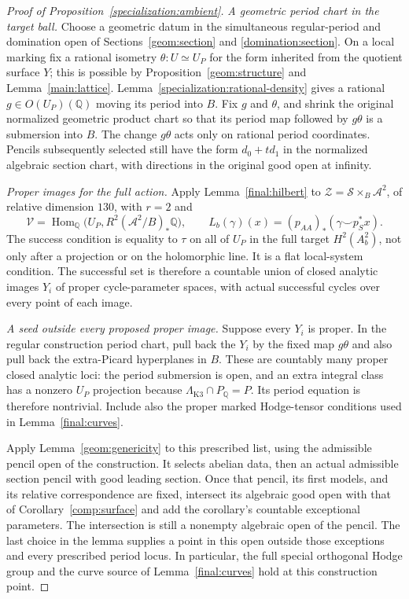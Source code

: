 \documentclass[11pt]{amsart}
\newcommand{\Q}{\mathbb Q}
\DeclareMathOperator{\Hom}{Hom}
\theoremstyle{definition}
\theoremstyle{remark}
\numberwithin{equation}{section}
\begin{document}
\begin{proof}[Proof of Proposition~\ref{specialization:ambient}]
\emph{A geometric period chart in the target ball.}
Choose a geometric datum in the simultaneous regular-period and
domination open of Sections~\ref{geom:section} and
\ref{domination:section}.  On a local marking fix a rational isometry
$\theta:U\simeq U_P$ for the form inherited from the quotient surface
$Y$; this is possible by Proposition~\ref{geom:structure} and
Lemma~\ref{main:lattice}.  Lemma~\ref{specialization:rational-density}
gives a rational $g\in O(U_P)(\Q)$ moving its period into $B$.
Fix $g$ and $\theta$, and shrink the original normalized geometric
product chart so that its period map followed by $g\theta$ is a
submersion into $B$.
The change $g\theta$ acts only on rational period coordinates.
Pencils subsequently selected still have the form $d_0+td_1$ in the
normalized algebraic section chart, with directions in the original
good open at infinity.

\emph{Proper images for the full action.}
Apply Lemma~\ref{final:hilbert} to
$\mathcal Z=\mathcal S\times_B\mathcal A^2$, of relative dimension
$130$, with $r=2$ and
\[
 \mathcal V=\Hom_{\Q}\bigl(U_P,R^2(\mathcal A^2/B)_*\Q\bigr),
 \qquad
 L_b(\gamma)(x)=(p_{AA})_*(\gamma\smile p_S^*x).
\]
The success condition is equality to $\tau$ on all of $U_P$ in the
full target $H^2(A_b^2)$, not only after a projection or on the
holomorphic line.  It is a flat local-system condition.  The successful
set is therefore a countable union of closed analytic images $Y_i$
of proper cycle-parameter spaces, with actual successful cycles over
every point of each image.

\emph{A seed outside every proposed proper image.}
Suppose every $Y_i$ is proper.  In the regular construction period
chart, pull back the $Y_i$ by the fixed map $g\theta$ and also pull
back the extra-Picard hyperplanes in $B$.  These are countably many
proper closed analytic loci: the period submersion is open, and an
extra integral class has a nonzero $U_P$ projection because
$\Lambda_{\mathrm{K3}}\cap P_{\Q}=P$.  Its period equation is
therefore nontrivial.
Include also the proper marked Hodge-tensor conditions used in
Lemma~\ref{final:curves}.

Apply Lemma~\ref{geom:genericity} to this prescribed list, using the
admissible pencil open of the construction.  It selects abelian data,
then an actual admissible section pencil with good leading section.
Once that pencil, its first models, and its relative correspondence
are fixed, intersect its algebraic good open with that of
Corollary~\ref{comp:surface} and add the corollary's countable
exceptional parameters.  The intersection is still a nonempty
algebraic open of the pencil.  The last choice in the lemma supplies
a point in this open outside those exceptions and every prescribed
period locus.
In particular, the full special orthogonal Hodge group and the curve source
of Lemma~\ref{final:curves} hold at this construction point.


\end{proof}
\end{document}
